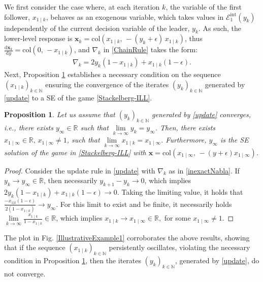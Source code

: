 \documentclass[letterpaper, 10 pt, conference]{ieeeconf}
\newcommand{\real}{\mathbb{R}}
\newcommand\xbf{\mathbf{x}}
\newtheorem{proposition}{Proposition}
\begin{document}
We first consider the case where, at each iteration $k$, the variable of the first follower, $x_{1 \mid k}$, behaves as an exogenous variable, which takes values in $\mathcal{E}_1^{\mathrm{int}}(y_k)$ %
independently of the current decision variable of the leader, $y_k$. As such, the lower-level response is $\xbf_k=\mathrm{col}(x_{1 \mid k},\,-(y_k+\epsilon)\,x_{1 \mid k})$,
thus $\frac{\text{d}\xbf_k}{\text{d}y}=\mathrm{col}(0, \, -x_{1\mid k})$, and $\nabla_k$ in \eqref{ChainRule} takes the form:
\begin{align}\label{inexactNabla}
\nabla_k=2y_k(1-x_{1 \mid k})+x_{1 \mid k}(1-\epsilon).
\end{align}
Next, Proposition \ref{Cost/Osc} establishes a necessary condition on 
the sequence $\left(x_{1 \mid k}\right)_{k \in \mathbb{N}}$ ensuring the convergence of the iterates $\left(y_k\right)_{k \in \mathbb{N}}$ generated by \eqref{update} to a SE of the game \eqref{Stackelberg-ILL}. 
\begin{proposition}\label{Cost/Osc}
    Let us assume that $\left(y_k\right)_{k \in \mathbb{N}}$ generated by \eqref{update} converges, i.e., there exists $y_{\infty} \in \real$ such that $\lim \limits_{k \rightarrow \infty} y_k = y_{\infty}$. Then, there exists $ x_{1 \mid \infty}\in \real, \, x_{1 \mid \infty} \neq 1$, such that $\lim \limits_{k \rightarrow \infty} x_{1 \mid k} = x_{1 \mid\infty}$. Furthermore, $y_\infty$ is the SE solution of the game in \eqref{Stackelberg-ILL} with $\xbf=\mathrm{col}(x_{1 \mid\infty}, \, -(y+\epsilon)x_{1 \mid \infty})$.
\end{proposition}
\begin{proof}
    Consider the update rule in \eqref{update} with $\nabla_k$ as in \eqref{inexactNabla}. If $y_k \rightarrow y_{\infty} \in \real$, then necessarily $y_{k+1}-y_k \rightarrow 0$, which implies $2 y_{k}(1-x_{1 \mid k})+x_{1 \mid k}(1-\epsilon) \rightarrow 0$. Taking the limiting value, it holds that $\frac{- x_{1|k}(1-\epsilon)}{2(1-x_{1 \mid k})} \rightarrow y_\infty$. For this limit to exist and be finite, it necessarily holds $\lim \limits_{k \rightarrow \infty}\frac{x_{1 \mid k}}{1-x_{1 \mid k}}\in \real$, which implies $x_{1 \mid k} \rightarrow x_{1 \mid \infty}\in \real,$ for some $ x_{1 \mid \infty} \neq 1$.
\end{proof}

The plot in Fig. \ref{IllustrativeExample1} corroborates the above results, showing that if the sequence $\left(x_{1 \mid k}\right)_{k \in \mathbb{N}}$ persistently oscillates, violating the necessary condition in Proposition \ref{Cost/Osc}, then the iterates $\left(y_k\right)_{k \in \mathbb{N}}$, generated by \eqref{update}, do not converge.  
\end{document}
